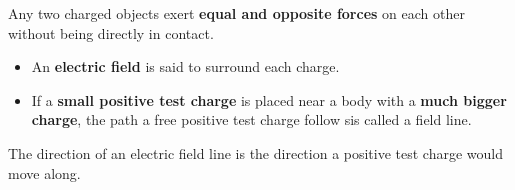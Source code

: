 Any two charged objects exert \textbf{equal and opposite forces} on each other without being directly in contact.
\begin{itemize}
    \item An \textbf{electric field} is said to surround each charge.
    \item If a \textbf{small positive test charge} is placed near a body with a \textbf{much bigger charge}, the path a free positive test charge follow sis called a field line.
\end{itemize}

The direction of an electric field line is the direction a positive test charge would move along.
